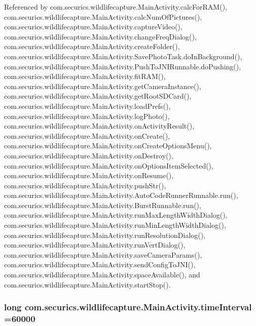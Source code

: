Referenced by com.\+securics.\+wildlifecapture.\+Main\+Activity.\+calc\+For\+R\+A\+M(), com.\+securics.\+wildlifecapture.\+Main\+Activity.\+calc\+Num\+Of\+Pictures(), com.\+securics.\+wildlifecapture.\+Main\+Activity.\+capture\+Video(), com.\+securics.\+wildlifecapture.\+Main\+Activity.\+change\+Freq\+Dialog(), com.\+securics.\+wildlifecapture.\+Main\+Activity.\+create\+Folder(), com.\+securics.\+wildlifecapture.\+Main\+Activity.\+Save\+Photo\+Task.\+do\+In\+Background(), com.\+securics.\+wildlifecapture.\+Main\+Activity.\+Push\+To\+J\+N\+I\+Runnable.\+do\+Pushing(), com.\+securics.\+wildlifecapture.\+Main\+Activity.\+fit\+R\+A\+M(), com.\+securics.\+wildlifecapture.\+Main\+Activity.\+get\+Camera\+Instance(), com.\+securics.\+wildlifecapture.\+Main\+Activity.\+get\+Root\+S\+D\+Card(), com.\+securics.\+wildlifecapture.\+Main\+Activity.\+load\+Prefs(), com.\+securics.\+wildlifecapture.\+Main\+Activity.\+log\+Photo(), com.\+securics.\+wildlifecapture.\+Main\+Activity.\+on\+Activity\+Result(), com.\+securics.\+wildlifecapture.\+Main\+Activity.\+on\+Create(), com.\+securics.\+wildlifecapture.\+Main\+Activity.\+on\+Create\+Options\+Menu(), com.\+securics.\+wildlifecapture.\+Main\+Activity.\+on\+Destroy(), com.\+securics.\+wildlifecapture.\+Main\+Activity.\+on\+Options\+Item\+Selected(), com.\+securics.\+wildlifecapture.\+Main\+Activity.\+on\+Resume(), com.\+securics.\+wildlifecapture.\+Main\+Activity.\+push\+Str(), com.\+securics.\+wildlifecapture.\+Main\+Activity.\+Auto\+Code\+Runner\+Runnable.\+run(), com.\+securics.\+wildlifecapture.\+Main\+Activity.\+Burst\+Runnable.\+run(), com.\+securics.\+wildlifecapture.\+Main\+Activity.\+run\+Max\+Length\+Width\+Dialog(), com.\+securics.\+wildlifecapture.\+Main\+Activity.\+run\+Min\+Length\+Width\+Dialog(), com.\+securics.\+wildlifecapture.\+Main\+Activity.\+run\+Resolution\+Dialog(), com.\+securics.\+wildlifecapture.\+Main\+Activity.\+run\+Vert\+Dialog(), com.\+securics.\+wildlifecapture.\+Main\+Activity.\+save\+Camera\+Params(), com.\+securics.\+wildlifecapture.\+Main\+Activity.\+send\+Config\+To\+J\+N\+I(), com.\+securics.\+wildlifecapture.\+Main\+Activity.\+space\+Available(), and com.\+securics.\+wildlifecapture.\+Main\+Activity.\+start\+Stop().

\subsubsection[{time\+Interval}]{\setlength{\rightskip}{0pt plus 5cm}long com.\+securics.\+wildlifecapture.\+Main\+Activity.\+time\+Interval =60000\hspace{0.3cm}{\ttfamily [static]}}\label{classcom_1_1securics_1_1wildlifecapture_1_1_main_activity_a290d0c371c64f7e4cb39b963dd70a7f9}



